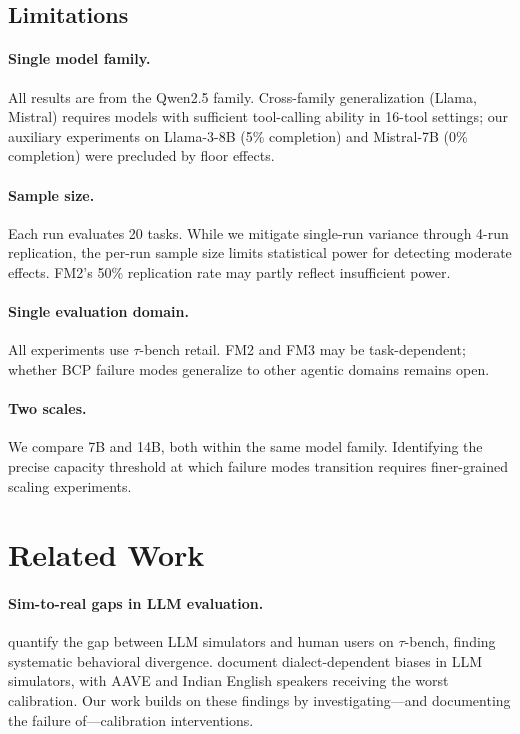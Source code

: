 \documentclass[11pt,a4paper]{article}
\begin{document}
\subsection{Limitations}

\paragraph{Single model family.} All results are from the Qwen2.5 family. Cross-family generalization (Llama, Mistral) requires models with sufficient tool-calling ability in 16-tool settings; our auxiliary experiments on Llama-3-8B (5\% completion) and Mistral-7B (0\% completion) were precluded by floor effects.

\paragraph{Sample size.} Each run evaluates 20 tasks. While we mitigate single-run variance through 4-run replication, the per-run sample size limits statistical power for detecting moderate effects. FM2's 50\% replication rate may partly reflect insufficient power.

\paragraph{Single evaluation domain.} All experiments use $\tau$-bench retail. FM2 and FM3 may be task-dependent; whether BCP failure modes generalize to other agentic domains remains open.

\paragraph{Two scales.} We compare 7B and 14B, both within the same model family. Identifying the precise capacity threshold at which failure modes transition requires finer-grained scaling experiments.

\section{Related Work}

\paragraph{Sim-to-real gaps in LLM evaluation.} \citet{sim2real2026gap} quantify the gap between LLM simulators and human users on $\tau$-bench, finding systematic behavioral divergence. \citet{seshadri2026lost} document dialect-dependent biases in LLM simulators, with AAVE and Indian English speakers receiving the worst calibration. Our work builds on these findings by investigating---and documenting the failure of---calibration interventions.
\end{document}
